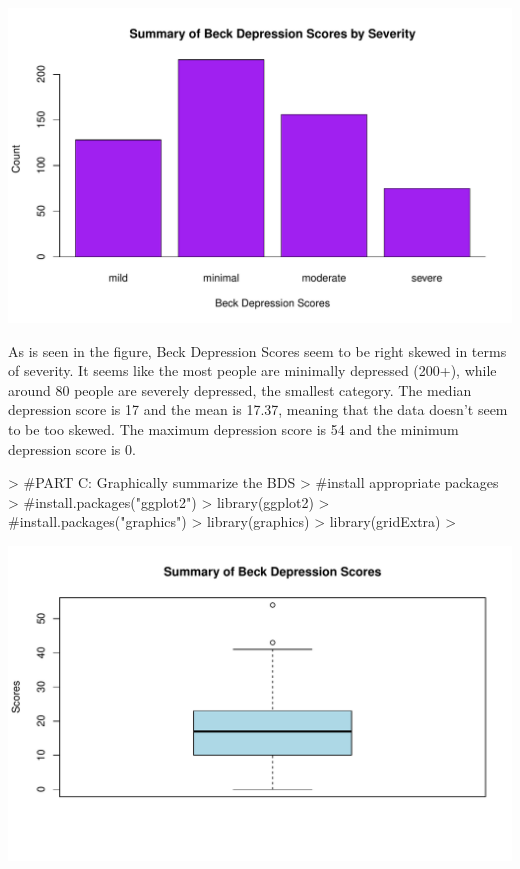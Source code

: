 \documentclass{article}
\begin{document}
\begin{enumerate}
\includegraphics{HW0-013}

As is seen in the figure, Beck Depression Scores seem to be right skewed in terms of severity. It seems like the most people are minimally depressed (200+), while around 80 people are severely depressed, the smallest category. The median depression score is 17 and the mean is 17.37, meaning that the data doesn't seem to be too skewed. The maximum depression score is 54 and the minimum depression score is 0.

\begin{Schunk}
\begin{Sinput}
> #PART C: Graphically summarize the BDS
> #install appropriate packages
> #install.packages("ggplot2")
> library(ggplot2)
> #install.packages("graphics")
> library(graphics)
> library(gridExtra)
> 
\end{Sinput}
\end{Schunk}

\includegraphics{HW0-015}


\end{enumerate}
\end{document}

